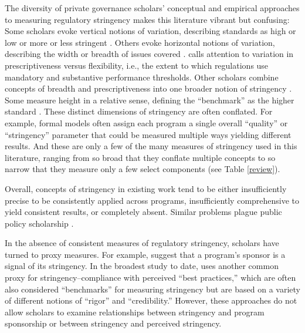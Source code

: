 \documentclass[
      12pt,
            Review ]{article}
\begin{document}
The diversity of private governance scholars' conceptual and empirical
approaches to measuring regulatory stringency makes this literature
vibrant but confusing: Some scholars evoke vertical notions of
variation, describing standards as high or low or more or less stringent
\citep{Fischer2014, Li2015}. Others evoke horizontal notions of
variation, describing the width or breadth of issues covered
\citep{Auld2014, Heyes2017}. \citet{Cashore2007} calls attention to
variation in prescriptiveness versus flexibility, i.e., the extent to
which regulations use mandatory and substantive performance thresholds.
Other scholars combine concepts of breadth and prescriptiveness into one
broader notion of stringency \citep{Fransen2011}. Some measure height in
a relative sense, defining the ``benchmark'' as the higher standard
\citep{Overdevest2005, Overdevest2010}. These distinct dimensions of
stringency are often conflated. For example, formal models often assign
each program a single overall ``quality'' or ``stringency'' parameter
that could be measured multiple ways yielding different results. And
these are only a few of the many measures of stringency used in this
literature, ranging from so broad that they conflate multiple concepts
to so narrow that they measure only a few select components (see Table
\ref{review}).

Overall, concepts of stringency in existing work tend to be either
insufficiently precise to be consistently applied across programs,
insufficiently comprehensive to yield consistent results, or completely
absent. Similar problems plague public policy scholarship
\citep{Brunel2016}.



In the absence of consistent measures of regulatory stringency, scholars
have turned to proxy measures. For example, \citet{Darnall2010} suggest
that a program's sponsor is a signal of its stringency. In the broadest
study to date, \citet{VanderVen2015} uses another common proxy for
stringency--compliance with perceived ``best practices,'' which are
often also considered ``benchmarks'' for measuring stringency but are
based on a variety of different notions of ``rigor'' and
``credibility.'' However, these approaches do not allow scholars to
examine relationships between stringency and program sponsorship or
between stringency and perceived stringency.
\end{document}
